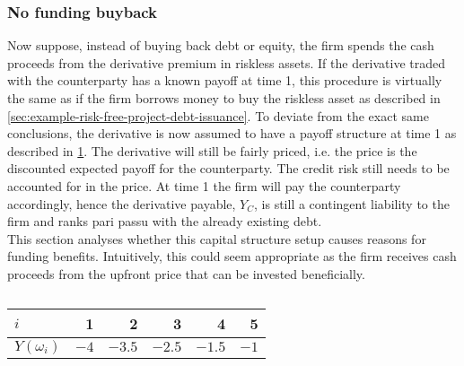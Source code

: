 \documentclass[main.tex]{subfiles}
\begin{document}
        \subsubsection{No funding buyback}
            Now suppose, instead of buying back debt or equity, 
            the firm spends the cash proceeds from the derivative premium in riskless assets. 
            If the derivative traded with the counterparty has a known payoff at time 1, this procedure is virtually the same as if the firm borrows money to buy the riskless asset 
            as described in \cref{sec:example-risk-free-project-debt-issuance}. 
            To deviate from the exact same conclusions, the derivative is now assumed to have a payoff structure at time 1 
            as described in \cref{tbl:risky-option-payoff}. 
            The derivative will still be fairly priced, i.e. the price is the discounted expected payoff for the counterparty. 
            The credit risk still needs to be accounted for in the price. 
            At time 1 the firm will pay the counterparty accordingly, hence the derivative payable, $Y_C$, 
            is still a contingent liability to the firm and ranks pari passu with the already existing debt.
            \\
            This section analyses whether this capital structure setup causes reasons for funding benefits.
            Intuitively, this could seem appropriate as the firm receives cash proceeds from the upfront price that can be invested beneficially.
            
            \begin{table}[H]
                \centering
                \begin{tabular}{l|rrrrr}
                    $i$ & 1 & 2 & 3 & 4 & 5 \\
                    \hline
                    $Y(\omega_{i})$ & $\num{-4}$ & $\num{-3.5}$ & $\num{-2.5}$ & $\num{-1.5}$ & $\num{-1}$ \\
                \end{tabular}
                \caption{}
                \label{tbl:risky-option-payoff}
            \end{table}
\end{document}
